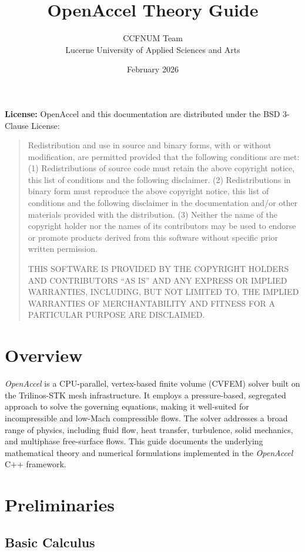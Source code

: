\documentclass[12pt]{extarticle}
\title{OpenAccel Theory Guide}
\author{CCFNUM Team\\Lucerne University of Applied Sciences and Arts}
\date{February 2026}
\newcommand{\<}{\langle}
\renewcommand{\>}{\rangle}
\theoremstyle{definition}
\begin{document}
\maketitle

\noindent\textbf{License:} OpenAccel and this documentation are distributed under the BSD 3-Clause License:
\begin{quotation}
\noindent Redistribution and use in source and binary forms, with or without modification, are permitted provided that the following conditions are met: (1) Redistributions of source code must retain the above copyright notice, this list of conditions and the following disclaimer. (2) Redistributions in binary form must reproduce the above copyright notice, this list of conditions and the following disclaimer in the documentation and/or other materials provided with the distribution. (3) Neither the name of the copyright holder nor the names of its contributors may be used to endorse or promote products derived from this software without specific prior written permission.

\smallskip\noindent THIS SOFTWARE IS PROVIDED BY THE COPYRIGHT HOLDERS AND CONTRIBUTORS ``AS IS'' AND ANY EXPRESS OR IMPLIED WARRANTIES, INCLUDING, BUT NOT LIMITED TO, THE IMPLIED WARRANTIES OF MERCHANTABILITY AND FITNESS FOR A PARTICULAR PURPOSE ARE DISCLAIMED.
\end{quotation}

\section{Overview}

\textit{OpenAccel} is a CPU-parallel, vertex-based finite volume (CVFEM) solver built on the Trilinos-STK mesh infrastructure. It employs a pressure-based, segregated approach to solve the governing equations, making it well-suited for incompressible and low-Mach compressible flows. The solver addresses a broad range of physics, including fluid flow, heat transfer, turbulence, solid mechanics, and multiphase free-surface flows. This guide documents the underlying mathematical theory and numerical formulations implemented in the \textit{OpenAccel} C++ framework.

\section{Preliminaries}
\subsection{Basic Calculus}
\end{document}
